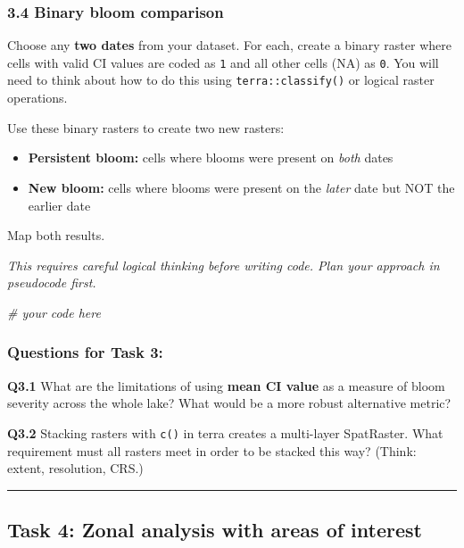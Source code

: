 \documentclass[
]{article}
\newenvironment{Shaded}{\begin{snugshade}}{\end{snugshade}}
\newcommand{\CommentTok}[1]{\textcolor[rgb]{0.56,0.35,0.01}{\textit{#1}}}
\providecommand{\tightlist}{%
  \setlength{\itemsep}{0pt}\setlength{\parskip}{0pt}}
\begin{document}
\subsubsection{3.4 Binary bloom
comparison}\label{binary-bloom-comparison}

Choose any \textbf{two dates} from your dataset. For each, create a
binary raster where cells with valid CI values are coded as \texttt{1}
and all other cells (NA) as \texttt{0}. You will need to think about how
to do this using \texttt{terra::classify()} or logical raster
operations.

Use these binary rasters to create two new rasters:

\begin{itemize}
\tightlist
\item
  \textbf{Persistent bloom:} cells where blooms were present on
  \emph{both} dates
\item
  \textbf{New bloom:} cells where blooms were present on the
  \emph{later} date but NOT the earlier date
\end{itemize}

Map both results.

\emph{This requires careful logical thinking before writing code. Plan
your approach in pseudocode first.}

\begin{Shaded}
\begin{Highlighting}[]
\CommentTok{\# your code here}
\end{Highlighting}
\end{Shaded}

\subsubsection{Questions for Task 3:}\label{questions-for-task-3}

\textbf{Q3.1} What are the limitations of using \textbf{mean CI value}
as a measure of bloom severity across the whole lake? What would be a
more robust alternative metric?

\textbf{Q3.2} Stacking rasters with \texttt{c()} in terra creates a
multi-layer SpatRaster. What requirement must all rasters meet in order
to be stacked this way? (Think: extent, resolution, CRS.)

\begin{center}\rule{0.5\linewidth}{0.5pt}\end{center}

\subsection{Task 4: Zonal analysis with areas of
interest}\label{task-4-zonal-analysis-with-areas-of-interest}
\end{document}
